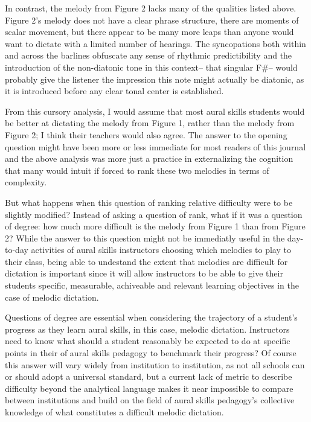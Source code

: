 \documentclass[english,man,floatsintext]{apa6}
\begin{document}
In contrast, the melody from Figure 2 lacks many of the qualities listed above.
Figure 2's melody does not have a clear phrase structure, there are moments of scalar movement, but there appear to be many more leaps than anyone would want to dictate with a limited number of hearings. The syncopations both within and across the barlines obfuscate any sense of rhythmic predictibility and the introduction of the non-diatonic tone in this context-- that singular F\#-- would probably give the listener the impression this note might actually be diatonic, as it is introduced before any clear tonal center is established.

From this cursory analysis, I would assume that most aural skills students would be better at dictating the melody from Figure 1, rather than the melody from Figure 2; I think their teachers would also agree.
The answer to the opening question might have been more or less immediate for most readers of this journal and the above analysis was more just a practice in externalizing the cognition that many would intuit if forced to rank these two melodies in terms of complexity.

But what happens when this question of ranking relative difficulty were to be slightly modified?
Instead of asking a question of rank, what if it was a question of degree: how much more difficult is the melody from Figure 1 than from Figure 2?
While the answer to this question might not be immediatly useful in the day-to-day activities of aural skills instructors choosing which melodies to play to their class, being able to undestand the extent that melodies are difficult for dictation is important since it will allow instructors to be able to give their students specific, measurable, achiveable and relevant learning objectives in the case of melodic dictation.

Questions of degree are essential when considering the trajectory of a student's progress as they learn aural skills, in this case, melodic dictation.
Instructors need to know what should a student reasonably be expected to do at specific points in their of aural skills pedagogy to benchmark their progress?
Of course this answer will vary widely from institution to institution, as not all schools can or should adopt a universal standard, but a current lack of metric to describe difficulty beyond the analytical language makes it near impossible to compare between institutions and build on the field of aural skills pedagogy's collective knowledge of what constitutes a difficult melodic dictation.
\end{document}
